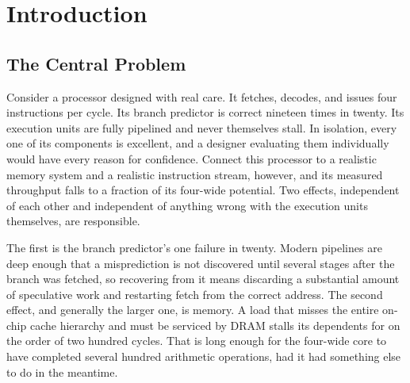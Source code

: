 \documentclass[12pt,a4paper]{report}
\begin{document}
\begin{abstract}
Taken together, these three perspectives show that processor
performance is not determined by execution units, memory technology, or
compiler decisions in isolation. It emerges from the interaction
between them, with each layer compensating for limitations that remain
at the others. The paper treats modern computer architecture
as a coordinated hardware--software system whose performance depends on
how effectively these layers work together.
\end{abstract}


\tableofcontents
\listoffigures
\listoftables

\renewcommand*{\descriptionname}{Explanation}
\renewcommand{\glossarypreamble}{%
  \noindent Terms are drawn from their first use in \cref{ch:intro,ch:pipeline-basics}.\par}
\glsaddall
\begingroup
\footnotesize
\renewcommand{\arraystretch}{0.85}
\setlength{\glsdescwidth}{0.74\textwidth}
\printglossary[title={Glossary},nopostdot,nonumberlist]
\endgroup

\chapter{Introduction}
\label{ch:intro}

\section{The Central Problem}
\label{sec:central-problem}

Consider a processor designed with real care. It fetches, decodes, and
issues four instructions per cycle. Its branch predictor is correct
nineteen times in twenty. Its execution units are fully pipelined and
never themselves stall. In isolation, every one of its components is
excellent, and a designer evaluating them individually would have every
reason for confidence. Connect this processor to a realistic memory
system and a realistic instruction stream, however, and its measured
throughput falls to a fraction of its four-wide potential. Two effects,
independent of each other and independent of anything wrong with the
execution units themselves, are responsible.

The first is the branch predictor's one failure in twenty. Modern
pipelines are deep enough that a misprediction is not discovered until
several stages after the branch was fetched, so recovering from it means
discarding a substantial amount of speculative work and restarting fetch
from the correct address. The second effect, and generally the larger
one, is memory. A load that misses the entire on-chip cache hierarchy
and must be serviced by DRAM stalls its dependents for on the order of
two hundred cycles. That is long enough for the four-wide core to have
completed several hundred arithmetic operations, had it had something
else to do in the meantime.
\end{document}
